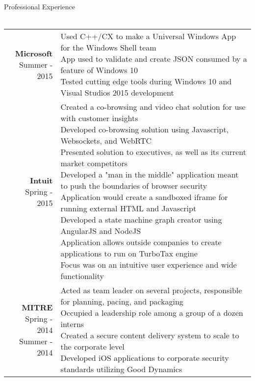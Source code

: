 \documentclass{article}
\makeatletter
\newcommand{\lineseparator}[1]{\noindent\makebox[\linewidth]{\rule{\textwidth}{#1}}}
\newcommand*\lineBr[2][c]{\begin{tabular}[#1]{@{}r@{}}#2\end{tabular}}
\newcommand*\lineBl[2][c]{\begin{tabular}[#1]{@{}l@{}}#2\end{tabular}}
\makeatother
\begin{document}
{\Large Professional Experience } \\
\lineseparator{0.5pt}
\\[4mm]
\begin{tabularx}{\textwidth}{ r | X }
  \vspace{4mm}
  \lineBr{ {\large {\bf Microsoft }\\[2mm]Summer - 2015}} &
  \lineBl{
    Used C++/CX to make a Universal Windows App for the Windows Shell team \\[2mm] 
    App used to validate and create JSON consumed by a feature of Windows 10 \\[2mm]
    Tested cutting edge tools during Windows 10 and Visual Studios 2015 development 
  } \\
  \vspace{4mm}
  \lineBr{ {\large {\bf Intuit }\\[2mm]Spring - 2015}} &
  \lineBl{
    Created a co-browsing and video chat solution for use with customer insights \\[2mm]
    Developed co-browsing solution using Javascript, Websockets, and WebRTC \\[1mm]
    Presented solution to executives, as well as its current market competitors \\[1mm]
    Developed a "man in the middle" application meant to push the boundaries of browser security \\[1mm]
    Application would create a sandboxed iframe for running external HTML and Javascript \\[1mm]
    Developed a state machine graph creator using AngularJS and NodeJS \\[1mm]
    Application allows outside companies to create applications to run on TurboTax engine \\[1mm]
    Focus was on an intuitive user experience and wide functionality 
  } \\
  \vspace{4mm}
  \lineBr{ {\large {\bf MITRE }\\[2mm]Spring - 2014\\Summer - 2014}} &
  \lineBl{
    Acted as team leader on several projects, responsible for planning, pacing, and packaging \\[1mm]
    Occupied a leadership role among a group of a dozen interns \\[1mm]
    Created a secure content delivery system to scale to the corporate level \\[1mm]
    Developed iOS applications to corporate security standards utilizing Good Dynamics \\[1mm]
}
\end{tabularx}
\end{document}
